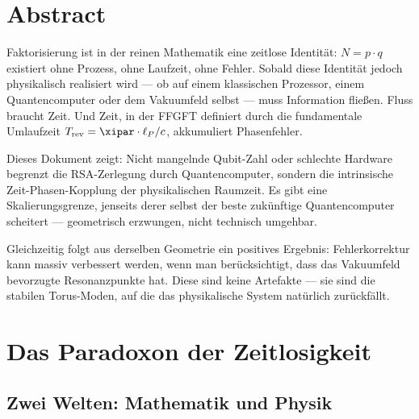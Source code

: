 
\section*{Abstract}

Faktorisierung ist in der reinen Mathematik eine zeitlose Identität: $N = p \cdot q$
existiert ohne Prozess, ohne Laufzeit, ohne Fehler. Sobald diese Identität jedoch
physikalisch realisiert wird — ob auf einem klassischen Prozessor, einem
Quantencomputer oder dem Vakuumfeld selbst — muss Information fließen. Fluss braucht
Zeit. Und Zeit, in der FFGFT definiert durch die fundamentale Umlaufzeit
$T_\text{rev} = \xipar \cdot \ell_P / c$, akkumuliert Phasenfehler.

Dieses Dokument zeigt: Nicht mangelnde Qubit-Zahl oder schlechte Hardware begrenzt
die RSA-Zerlegung durch Quantencomputer, sondern die intrinsische Zeit-Phasen-Kopplung
der physikalischen Raumzeit. Es gibt eine Skalierungsgrenze, jenseits derer selbst
der beste zukünftige Quantencomputer scheitert — geometrisch erzwungen, nicht
technisch umgehbar.

Gleichzeitig folgt aus derselben Geometrie ein positives Ergebnis: Fehlerkorrektur
kann massiv verbessert werden, wenn man berücksichtigt, dass das Vakuumfeld
bevorzugte Resonanzpunkte hat. Diese sind keine Artefakte — sie sind die stabilen
Torus-Moden, auf die das physikalische System natürlich zurückfällt.

\clearpage

\section{Das Paradoxon der Zeitlosigkeit}

\subsection{Zwei Welten: Mathematik und Physik}

